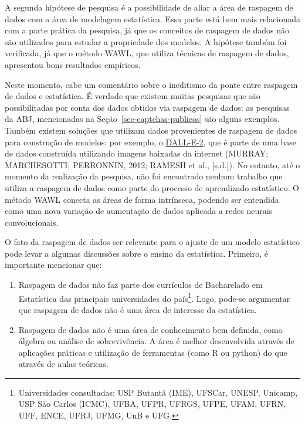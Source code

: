 \documentclass[12pt,twoside,brazilian]{book}
\providecommand{\tightlist}{%
  \setlength{\itemsep}{0pt}\setlength{\parskip}{0pt}}
\begin{document}
A segunda hipótese de pesquisa é a possibilidade de aliar a área de
raspagem de dados com a área de modelagem estatística. Essa parte está
bem mais relacionada com a parte prática da pesquisa, já que os
conceitos de raspagem de dados não são utilizados para estudar a
propriedade dos modelos. A hipótese também foi verificada, já que o
método WAWL, que utiliza técnicas de raspagem de dados, apresentou bons
resultados empíricos.

Neste momento, cabe um comentário sobre o ineditismo da ponte entre
raspagem de dados e estatística. É verdade que existem muitas pesquisas
que são possibilitadas por conta dos dados obtidos via raspagem de
dados: as pesquisas da ABJ, mencionadas na
Seção~\ref{sec-captchas-publicos} são alguns exemplos. Também existem
soluções que utilizam dados provenientes de raspagem de dados para
construção de modelos: por exemplo, o
\href{https://openai.com/dall-e-2/}{DALL-E-2}, que é parte de uma base
de dados construída utilizando imagens baixadas da internet (MURRAY;
MARCHESOTTI; PERRONNIN, 2012; RAMESH et al., {[}s.d.{]}). No entanto,
até o momento da realização da pesquisa, não foi encontrado nenhum
trabalho que utiliza a raspagem de dados como parte do processo de
aprendizado estatístico. O método WAWL conecta as áreas de forma
intrínseca, podendo ser entendida como uma nova variação de aumentação
de dados aplicada a redes neurais convolucionais.

O fato da raspagem de dados ser relevante para o ajuste de um modelo
estatístico pode levar a algumas discussões sobre o ensino da
estatística. Primeiro, é importante mencionar que:

\begin{enumerate}
\def\labelenumi{\arabic{enumi}.}
\tightlist
\item
  Raspagem de dados não faz parte dos currículos de Bacharelado em
  Estatística das principais universidades do país\footnote{Universidades
    consultadas: USP Butantã (IME), UFSCar, UNESP, Unicamp, USP São
    Carlos (ICMC), UFBA, UFPR, UFRGS, UFPE, UFAM, UFRN, UFF, ENCE, UFRJ,
    UFMG, UnB e UFG.}. Logo, pode-se argumentar que raspagem de dados
  não é uma área de interesse da estatística.
\item
  Raspagem de dados não é uma área de conhecimento bem definida, como
  álgebra ou análise de sobrevivência. A área é melhor desenvolvida
  através de aplicações práticas e utilização de ferramentas (como R ou
  python) do que através de aulas teóricas.
\end{enumerate}
\end{document}

